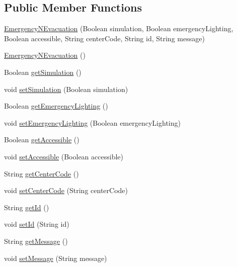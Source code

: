 \subsection*{Public Member Functions}
\begin{DoxyCompactItemize}
\item 
\mbox{\hyperlink{classcom_1_1osoc_1_1oncera_1_1javabean_1_1_emergency_n_evacuation_a77b44c5d691b2486ec1d36b2c19ed8b7}{Emergency\+N\+Evacuation}} (Boolean simulation, Boolean emergency\+Lighting, Boolean accessible, String center\+Code, String id, String message)
\item 
\mbox{\hyperlink{classcom_1_1osoc_1_1oncera_1_1javabean_1_1_emergency_n_evacuation_a4bde956fba3b1842f32d2884dbaad9d8}{Emergency\+N\+Evacuation}} ()
\item 
Boolean \mbox{\hyperlink{classcom_1_1osoc_1_1oncera_1_1javabean_1_1_emergency_n_evacuation_ae8248eabffcf824600ed76a5ffa53883}{get\+Simulation}} ()
\item 
void \mbox{\hyperlink{classcom_1_1osoc_1_1oncera_1_1javabean_1_1_emergency_n_evacuation_a43c43aec731eae8bc97b193d0ece3a67}{set\+Simulation}} (Boolean simulation)
\item 
Boolean \mbox{\hyperlink{classcom_1_1osoc_1_1oncera_1_1javabean_1_1_emergency_n_evacuation_a241bfe372175fdbafbaed00997c4f41b}{get\+Emergency\+Lighting}} ()
\item 
void \mbox{\hyperlink{classcom_1_1osoc_1_1oncera_1_1javabean_1_1_emergency_n_evacuation_aff9c8e286b6c51c1f696821fc3003a87}{set\+Emergency\+Lighting}} (Boolean emergency\+Lighting)
\item 
Boolean \mbox{\hyperlink{classcom_1_1osoc_1_1oncera_1_1javabean_1_1_emergency_n_evacuation_a415c24b51385f254e0d8f2ea223dbb68}{get\+Accessible}} ()
\item 
void \mbox{\hyperlink{classcom_1_1osoc_1_1oncera_1_1javabean_1_1_emergency_n_evacuation_aed10ade6ca7adc023b3dcdd5961d0e2f}{set\+Accessible}} (Boolean accessible)
\item 
String \mbox{\hyperlink{classcom_1_1osoc_1_1oncera_1_1javabean_1_1_emergency_n_evacuation_a7c0c8825bdae1c19a59e32603354138c}{get\+Center\+Code}} ()
\item 
void \mbox{\hyperlink{classcom_1_1osoc_1_1oncera_1_1javabean_1_1_emergency_n_evacuation_a6b582f754e11a4cd5f3a7e692b9d954e}{set\+Center\+Code}} (String center\+Code)
\item 
String \mbox{\hyperlink{classcom_1_1osoc_1_1oncera_1_1javabean_1_1_emergency_n_evacuation_a1796c4874238325b5654b4d1930bbe24}{get\+Id}} ()
\item 
void \mbox{\hyperlink{classcom_1_1osoc_1_1oncera_1_1javabean_1_1_emergency_n_evacuation_a33253bab662218c8a814b6aa87a4446b}{set\+Id}} (String id)
\item 
String \mbox{\hyperlink{classcom_1_1osoc_1_1oncera_1_1javabean_1_1_emergency_n_evacuation_a26973ac63f967b34a883678210c0ff7c}{get\+Message}} ()
\item 
void \mbox{\hyperlink{classcom_1_1osoc_1_1oncera_1_1javabean_1_1_emergency_n_evacuation_a150b9e28b0c35fab0431f28f9e9d2fd7}{set\+Message}} (String message)
\end{DoxyCompactItemize}


